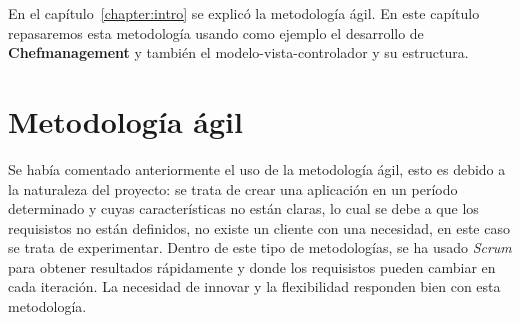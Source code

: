 
En el capítulo~\ref{chapter:intro} se explicó la metodología ágil. En este capítulo repasaremos esta metodología usando como ejemplo el desarrollo de \textbf{Chefmanagement} y también el modelo-vista-controlador y su estructura.

\vspace*{0.2in}
\section{Metodología ágil}\label{cap.4.1}

Se había comentado anteriormente el uso de la metodología ágil, esto es debido a la naturaleza del proyecto: se trata de crear una aplicación en un período determinado y cuyas características no están claras, lo cual se debe a que los requisistos no están definidos, no existe un cliente con una necesidad, en este caso se trata de experimentar. Dentro de este tipo de metodologías, se ha usado \emph{Scrum} para obtener resultados rápidamente y donde los requisistos pueden cambiar en cada iteración. La necesidad de innovar y la flexibilidad responden bien con esta metodología. \\


